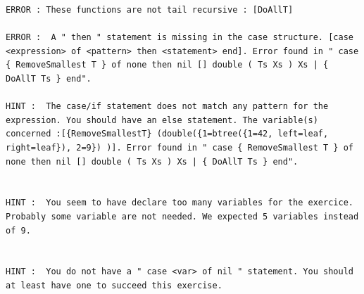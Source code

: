 \documentclass[11pt,a4paper,twoside,openright]{report}
\begin{document}
\begin{lstlisting}
ERROR : These functions are not tail recursive : [DoAllT]

ERROR :  A " then " statement is missing in the case structure. [case <expression> of <pattern> then <statement> end]. Error found in " case { RemoveSmallest T } of none then nil [] double ( Ts Xs ) Xs | { DoAllT Ts } end".

HINT :  The case/if statement does not match any pattern for the expression. You should have an else statement. The variable(s) concerned :[{RemoveSmallestT} (double({1=btree({1=42, left=leaf, right=leaf}), 2=9}) )]. Error found in " case { RemoveSmallest T } of none then nil [] double ( Ts Xs ) Xs | { DoAllT Ts } end".


HINT :  You seem to have declare too many variables for the exercice. Probably some variable are not needed. We expected 5 variables instead of 9.


HINT :  You do not have a " case <var> of nil " statement. You should at least have one to succeed this exercise.
\end{lstlisting}
\end{document}

